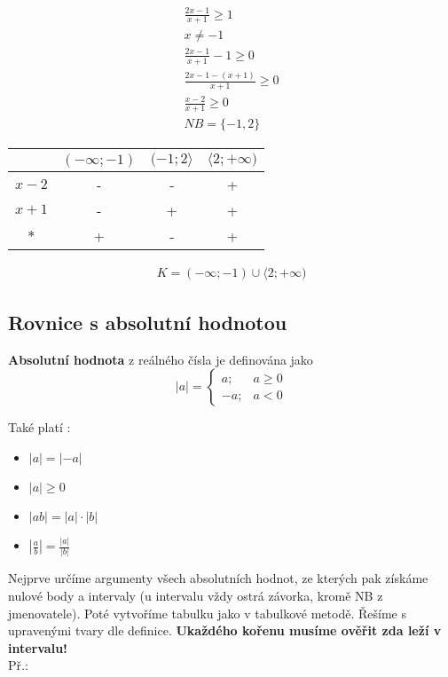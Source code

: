 \documentclass[12pt, a4paper]{article}
\begin{document}
\[
\begin{aligned}
\frac{2x-1}{x+1} \geq 1\\
x \neq -1\\
\frac{2x-1}{x+1} -1 \geq 0\\
\frac{2x-1-(x+1)}{x+1} \geq 0\\
\frac{x-2}{x+1} \geq 0\\
NB = \{-1,2\}
\end{aligned}\]

\begin{center}
\begin{tabular}{| c | c | c | c |}
\hline
 & $(-\infty;-1)$ & $(-1;2 \rangle $ & $ \langle 2;+\infty)$\\
\hline
$x-2$ & - & - & +\\
\hline
$x+1$ & - & + & +\\
\hline
$*$ & + & - & +\\
\hline
\end{tabular}
\end{center}

\[\begin{aligned}
K = (-\infty;-1) \cup \langle 2; +\infty)
\end{aligned}\]

\subsection*{Rovnice s absolutní hodnotou}
\textbf{Absolutní hodnota} z reálného čísla je definována jako\\
\[
   |a| =
    \begin{cases}
        a; & a \geq 0 \\
        -a; & a < 0
    \end{cases}
\]

Také platí :\\
\begin{itemize}

\item $|a|=|-a|$
\item $|a| \geq 0$
\item $|ab|=|a| \cdot |b|$
\item $|\frac{a}{b}| = \frac{|a|}{|b|}$
\end{itemize}

Nejprve určíme argumenty všech absolutních hodnot, ze kterých pak získáme nulové body a intervaly (u intervalu vždy ostrá závorka, kromě NB z jmenovatele). Poté vytvoříme
tabulku jako v tabulkové metodě. Řešíme s upravenými tvary dle definice. \textbf{Ukaždého kořenu musíme ověřit zda leží v intervalu!}\\
Př.:\\
\end{document}
